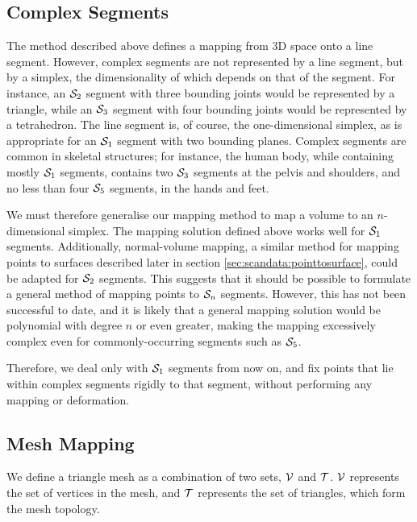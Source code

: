 \subsection{\label{sec:skeletalanim:mapping:complex}Complex Segments}

The method described above defines a mapping from 3D space onto a line segment. However, complex segments are not represented by a line segment, but by a simplex, the dimensionality of which depends on that of the segment. For instance, an ${\cal S}_2$ segment with three bounding joints would be represented by a triangle, while an ${\cal S}_3$ segment with four bounding joints would be represented by a tetrahedron. The line segment is, of course, the one-dimensional simplex, as is appropriate for an ${\cal S}_1$ segment with two bounding planes. Complex segments are common in skeletal structures; for instance, the human body, while containing mostly ${\cal S}_1$ segments, contains two ${\cal S}_3$ segments at the pelvis and shoulders, and no less than four ${\cal S}_5$ segments, in the hands and feet.

We must therefore generalise our mapping method to map a volume to an $n$-dimensional simplex. The mapping solution defined above works well for ${\cal S}_1$ segments. Additionally, normal-volume mapping, a similar method for mapping points to surfaces described later in section \ref{sec:scandata:pointtosurface}, could be adapted for ${\cal S}_2$ segments. This suggests that it should be possible to formulate a general method of mapping points to ${\cal S}_n$ segments. However, this has not been successful to date, and it is likely that a general mapping solution would be polynomial with degree $n$ or even greater, making the mapping excessively complex even for commonly-occurring segments such as ${\cal S}_5$.

Therefore, we deal only with ${\cal S}_1$ segments from now on, and fix points that lie within complex segments rigidly to that segment, without performing any mapping or deformation.

\subsection{\label{sec:skeletalanim:mapping:mesh}Mesh Mapping}

We define a triangle mesh as a combination of two sets, ${\cal V}\symbol{verts}$ and ${\cal T}\symbol{tris}$. ${\cal V}$ represents the set of vertices in the mesh, and ${\cal T}$ represents the set of triangles, which form the mesh topology.

